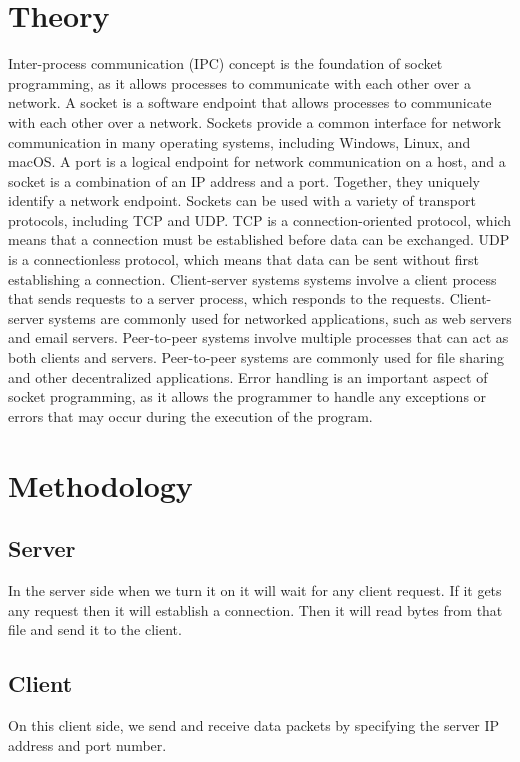\documentclass[11pt]{article}
\begin{document}
\section{Theory}
Inter-process communication (IPC) concept is the foundation of socket programming, as it allows processes to communicate with each other over a network. A socket is a software endpoint that allows processes to communicate with each other over a network. Sockets provide a common interface for network communication in many operating systems, including Windows, Linux, and macOS. A port is a logical endpoint for network communication on a host, and a socket is a combination of an IP address and a port. Together, they uniquely identify a network endpoint. Sockets can be used with a variety of transport protocols, including TCP and UDP. TCP is a connection-oriented protocol, which means that a connection must be established before data can be exchanged. UDP is a connectionless protocol, which means that data can be sent without first establishing a connection. Client-server systems systems involve a client process that sends requests to a server process, which responds to the requests. Client-server systems are commonly used for networked applications, such as web servers and email servers. Peer-to-peer systems involve multiple processes that can act as both clients and servers. Peer-to-peer systems are commonly used for file sharing and other decentralized applications. Error handling is an important aspect of socket programming, as it allows the programmer to handle any exceptions or errors that may occur during the execution of the program.


\section{Methodology}

\subsection{Server}
In the server side when we turn it on it will wait for any client request. If it
gets any request then it will establish a connection. Then it will read bytes from that file and send it to the client.

\subsection{Client}
On this client side, we send and receive data packets by specifying the server IP address and port number.
\end{document}
